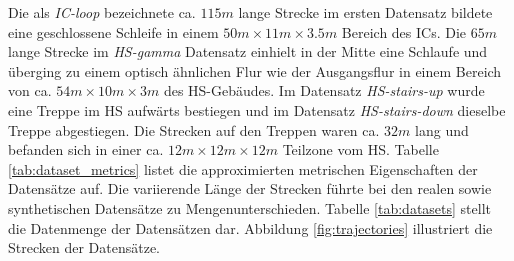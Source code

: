 Die als \textit{IC-loop} bezeichnete ca. $115m$ lange Strecke im ersten Datensatz bildete eine geschlossene Schleife in einem $50m \times 11m \times 3.5m$ Bereich des ICs. Die $65m$ lange Strecke im \textit{HS-gamma} Datensatz einhielt in der Mitte eine Schlaufe und überging zu einem optisch ähnlichen Flur wie der Ausgangsflur in einem Bereich von ca. $54m \times 10m \times 3m$ des HS-Gebäudes. Im Datensatz \textit{HS-stairs-up} wurde eine Treppe im HS aufwärts bestiegen und im Datensatz \textit{HS-stairs-down} dieselbe Treppe abgestiegen. Die Strecken auf den Treppen waren ca. $32m$ lang und befanden sich in einer ca. $12m \times 12m \times 12m$ Teilzone vom HS.
Tabelle \ref{tab:dataset_metrics} listet die approximierten metrischen Eigenschaften der Datensätze auf. 
Die variierende Länge der Strecken führte bei den realen sowie synthetischen Datensätze zu Mengenunterschieden. Tabelle \ref{tab:datasets} stellt die Datenmenge der Datensätzen dar.
Abbildung \ref{fig:trajectories} illustriert die Strecken der Datensätze. 
